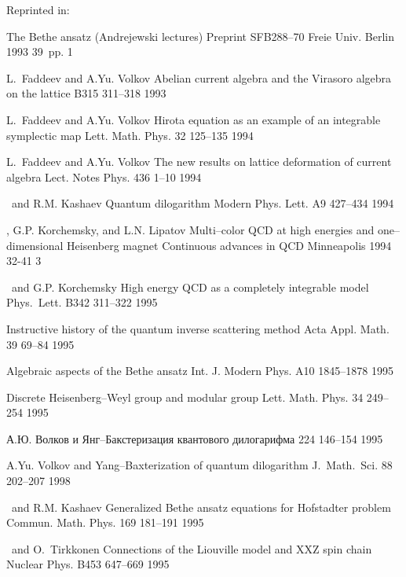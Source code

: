 {Reprinted in:  

{\LF}
{The Bethe ansatz (Andrejewski lectures)}
{Preprint SFB288--70} {Freie Univ.} {Berlin} {1993} {} {39~pp.} {1}

{L.~Faddeev and A.Yu. Volkov}
{Abelian current algebra and the Virasoro algebra on the lattice}
{\PL} {B315} {} {311--318} {1993}

{L.~Faddeev and A.Yu. Volkov}
{Hirota equation as an example of an integrable symplectic map}
{Lett. Math. Phys.} {32} {} {125--135} {1994}

\sbibitem{1994dd}
{L.~Faddeev and A.Yu. Volkov}
{The new results on lattice deformation of current algebra}
{Lect. Notes Phys.} {436} {} {1--10} {1994}

{\LF\ and R.M. Kashaev}
{Quantum dilogarithm}
{Modern Phys. Lett.} {A9} {} {427--434} {1994}

{\LF, G.P. Korchemsky, and L.N. Lipatov}
{Multi--color QCD at high energies and one--dimensional
Heisenberg magnet}
{Continuous advances in QCD} {} {Minneapolis} {1994} {} {32-41} {3}

{\LF\ and G.P. Korchemsky}
{High energy QCD as a completely integrable model}
{Phys.\ Lett.} {B342} {} {311--322} {1995}

{\LF}
{Instructive history of the quantum inverse scattering method}
{Acta Appl. Math.} {39} {} {69--84} {1995}

{\LF}
{Algebraic aspects of the {B}ethe ansatz}
{Int. J. Modern Phys.} {A10} {} {1845--1878} {1995}

{\LF}
{Discrete Heisenberg--Weyl group and modular group}
{Lett. Math. Phys.} {34} {} {249--254} {1995}

{А.Ю. Волков и \LD}
{Янг--Бакстеризация квантового дилогарифма}
{\Zap} {224} {} {146--154} {1995}

{A.Yu. Volkov and \LF}
{Yang--Baxterization of quantum dilogarithm}
{J.\ Math.\ Sci.} {88} {202--207} {1998}

{\LF\ and R.M. Kashaev}
{Generalized Bethe ansatz equations for Hofstadter problem}
{Commun. Math. Phys.} {169} {} {181--191} {1995}

{\LF\ and O.~Tirkkonen}
{Connections of the {L}iouville model and {XXZ} spin chain}
{Nuclear Phys.} {B453} {} {647--669} {1995}

}
